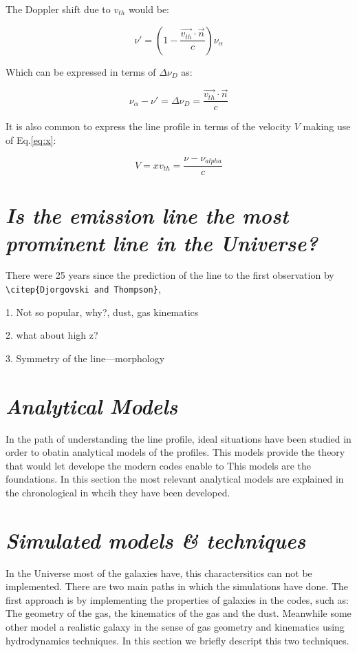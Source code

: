 The Doppler shift due to $v_{th}$ would be:

\begin{equation}
\nu'= (1 - \dfrac{\vec{v_{th}}\cdot\vec{n}}{c})\nu_{\alpha}
\end{equation}

Which can be expressed in terms of $\Delta \nu_D$ as: 

\begin{equation}
\nu_{\alpha} - \nu' = \Delta\nu_D =  \dfrac{\vec{v_{th}}\cdot\vec{n}}{c}
\end{equation}

It is also common to express the line profile in terms of the velocity $V$
making use of Eq.\ref{eq:x}:

\begin{equation}
V = xv_{th} = \dfrac{\nu - \nu_{alpha}}c
\end{equation}

\section{\emph{Is the \ly emission line the most prominent line in the Universe?}}

There were 25 years since the prediction of the \ly line to the first observation by \verb+\citep{Djorgovski and Thompson}+, 

1. Not so popular, why?, dust, gas kinematics

2. what about high z?

3. Symmetry of the line---morphology

\section{\emph{Analytical Models}}

In the path of understanding the \ly line profile, ideal 
situations have been studied in order to obatin analytical 
models of the profiles. This models provide the theory that
would let develope the modern codes enable to 
This models are the foundations. In this section the most relevant 
analytical models are explained in the chronological in whcih 
they have been developed. 
 

\section{\emph{Simulated models \& techniques}}

In the Universe most of the galaxies have, this charactersitics
can not be implemented. There are two main paths in which the 
simulations have done. The first approach is by implementing 
the properties of galaxies in the codes, such as: The geometry
of the gas, the kinematics of the gas and the dust. Meanwhile 
some other model a realistic galaxy in the sense of gas geometry
and kinematics using hydrodynamics techniques. In this section 
we briefly descript this two techniques. 

